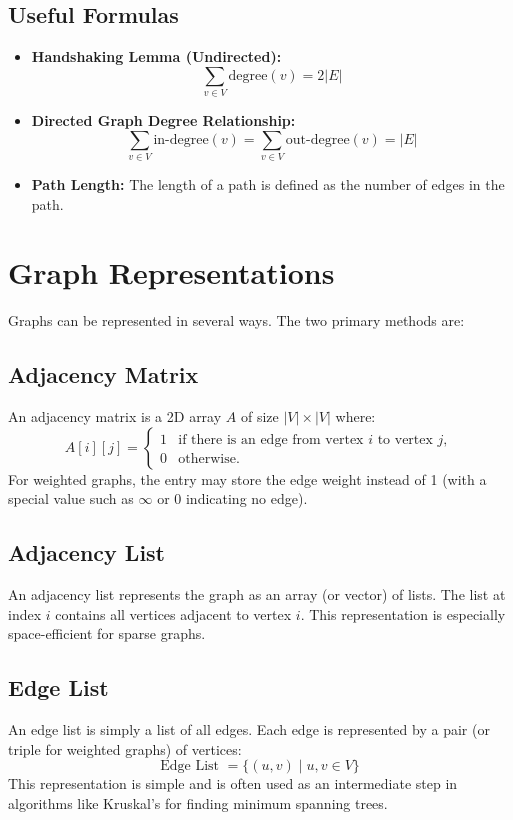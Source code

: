 \subsection{Useful Formulas}
\begin{itemize}
    \item \textbf{Handshaking Lemma (Undirected):} 
    \[
    \sum_{v \in V} \text{degree}(v) = 2|E|
    \]
    \item \textbf{Directed Graph Degree Relationship:}
    \[
    \sum_{v \in V} \text{in-degree}(v) = \sum_{v \in V} \text{out-degree}(v) = |E|
    \]
    \item \textbf{Path Length:} The length of a path is defined as the number of edges in the path.
\end{itemize}

\section{Graph Representations}
Graphs can be represented in several ways. The two primary methods are:

\subsection{Adjacency Matrix}
An adjacency matrix is a 2D array \( A \) of size \( |V| \times |V| \) where:
\[
A[i][j] = \begin{cases}
1 & \text{if there is an edge from vertex } i \text{ to vertex } j, \\
0 & \text{otherwise.}
\end{cases}
\]
For weighted graphs, the entry may store the edge weight instead of 1 (with a special value such as \(\infty\) or 0 indicating no edge).

\subsection{Adjacency List}
An adjacency list represents the graph as an array (or vector) of lists. The list at index \( i \) contains all vertices adjacent to vertex \( i \). This representation is especially space-efficient for sparse graphs.

\subsection{Edge List}
An edge list is simply a list of all edges. Each edge is represented by a pair (or triple for weighted graphs) of vertices:
\[
\text{Edge List } = \{(u,v) \mid u, v \in V\}
\]
This representation is simple and is often used as an intermediate step in algorithms like Kruskal's for finding minimum spanning trees.

